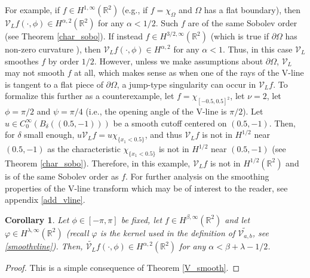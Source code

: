\documentclass[a4paper,12pt]{amsart}
\numberwithin{equation}{section}
\theoremstyle{plain}
\numberwithin{theorem}{section}
\newtheorem{corollary}[theorem]{Corollary}
\theoremstyle{definition}
\theoremstyle{remark}
\theoremstyle{remark}
\theoremstyle{remark}
\begin{document}
For example, if $f \in H^{1,\infty}(\mathbb{R}^2)$ (e.g., if $f = \chi_\Omega$ and $\Omega$ has a flat boundary), then $\mathcal{V}_L f(\cdot,\phi) \in H^{\alpha,2}(\mathbb{R}^2)$ for any $\alpha <1/2$. Such $f$ are of the same Sobolev order (see Theorem \ref{char_sobo}). If instead $f \in H^{3/2,\infty}(\mathbb{R}^2)$ (which is true if $\partial \Omega$ has non-zero curvature \cite{f1,f2}), then $\mathcal{V}_L f(\cdot,\phi) \in H^{\alpha,2}$ for any $\alpha <1$. Thus, in this case $\mathcal{V}_L$ smoothes $f$ by order $1/2$. However, unless we make assumptions about $\partial \Omega$, $\mathcal{V}_L$ may not smooth $f$ at all, which makes sense as when one of the rays of the V-line is tangent to a flat piece of $\partial \Omega$, a jump-type singularity can occur in $\mathcal{V}_Lf$. To formalize this further as a counterexample, let $f = \chi_{[-0.5,0.5]^2}$, let $\nu = 2$, let $\phi = \pi/2$ and $\psi = \pi/4$ (i.e., the opening angle of the V-line is $\pi/2$). Let $u \in C_0^\infty(B_\delta((0.5,-1)))$ be a smooth cutoff centered on $(0.5,-1)$. Then, for $\delta$ small enough, $u \mathcal{V}_L f = u \chi_{\{x_1 < 0.5\}}$, and thus $\mathcal{V}_L f$ is not in $H^{1/2}$ near $(0.5,-1)$ as the characteristic $\chi_{\{x_1 < 0.5\}}$ is not in $H^{1/2}$ near $(0.5,-1)$ (see Theorem \ref{char_sobo}). Therefore, in this example, $\mathcal{V}_L f$ is not in $H^{1/2}(\mathbb{R}^2)$ and is of the same Sobolev order as $f$. For further analysis on the smoothing properties of the V-line transform which may be of interest to the reader, see appendix \ref{add_vline}.

\begin{corollary}
Let $\phi \in [-\pi,\pi]$ be fixed, let $f \in H^{\beta,\infty}(\mathbb{R}^2)$ and let $\varphi \in H^{\lambda,\infty}(\mathbb{R}^2)$ (recall $\varphi$ is the kernel used in the definition of $\widetilde{\mathcal{V}_{a,b}}$, see \eqref{smoothvline}). Then, $\widetilde{\mathcal{V}_L} f (\cdot,\phi) \in H^{\alpha,2}(\mathbb{R}^2)$ for any $\alpha < \beta + \lambda - 1/2$.
\end{corollary}
\begin{proof}
This is a simple consequence of Theorem \ref{V_smooth}.
\end{proof}
\end{document}
